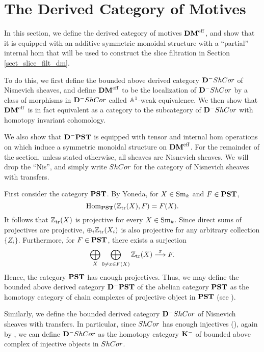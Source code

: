 \newpage
\section{The Derived Category of Motives}\label{sect_dmeff_and_dm}

In this section, we define the derived category of motives $\DMeff$,
and show that it is equipped with an additive symmetric monoidal 
structure with a ``partial'' internal hom that will be used to 
construct the slice filtration in Section 
\ref{sect_slice_filt_dm}.

To do this, we first define the bounded above derived category 
$\DCat^-\ShCor$ of Nisnevich sheaves, and define $\DMeff$ to be
the localization of $\DCat^-\ShCor$ by a class of morphisms in
$\DCat^-\ShCor$ called $\A^1$-weak equivalence. We then show that
$\DMeff$ is in fact equivalent as a category to the subcategory
of $\DCat^-\ShCor$ with homotopy invariant cohomology. 

We also show that $\DCat^-\PST$ is equipped with tensor and 
internal hom operations on which induce a symmetric monoidal 
structure on $\DMeff$. For the remainder of the section, unless 
stated otherwise, all sheaves are Nisnevich sheaves. We will drop 
the ``Nis'', and simply write $\ShCor$ for the category of 
Nisnevich sheaves with transfers.

First consider the category $\PST$. By Yoneda, for $X \in \Sm$ and
$F \in \PST$,
\[
\hom_{\PST}(\Ztr(X), F) = F(X).
\]
It follows that $\Ztr(X)$ is projective for every $X \in \Sm$.
Since direct sums of projectives are projective, 
$\oplus_i \Ztr(X_i)$ is also projective for any arbitrary 
collection $\{Z_i\}$. Furthermore, for $F \in \PST$, there exists 
a surjection
\begin{equation}\label{eq_res_by_rep}
\bigoplus_{X} \bigoplus_{0 \neq x \in F(X)} \Ztr(X) 
   \stackrel{x}{\to} F.
\end{equation}
Hence, the category $\PST$ has enough projectives. Thus, we may 
define the bounded above derived category $\DCat[D]^-\PST$ of the 
abelian category $\PST$ as the homotopy category of chain 
complexes of projective object in $\PST$ (see 
\cite[Thm. 10.4.8]{WH}).

Similarly, we define the bounded derived category $\DCat^- \ShCor$
of Nisnevich sheaves with transfers. In particular, since $\ShCor$
has enough injectives (\cite[Thm. 13.1]{MVW}), again by 
\cite[Thm. 10.4.8]{WH}, we can define $\DCat^-\ShCor$ as the homotopy
category $\DCat[K]^-$ of bounded above complex of injective objects
in $\ShCor$. 

